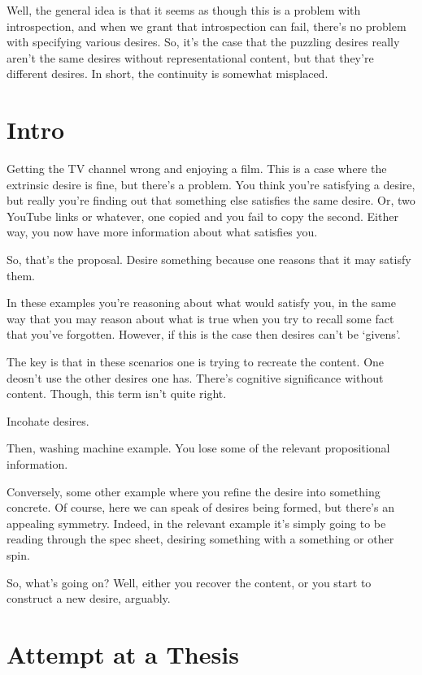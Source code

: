 \documentclass[10pt]{article}
\begin{document}
{\color{blue} Well, the general idea is that it seems as though this is a problem with introspection, and when we grant that introspection can fail, there's no problem with specifying various desires.
  So, it's the case that the puzzling desires really aren't the same desires without representational content, but that they're different desires.
  In short, the continuity is somewhat misplaced.}



\section{Intro}
\label{sec:intro}

Getting the TV channel wrong and enjoying a film.
This is a case where the extrinsic desire is fine, but there's a problem.
You think you're satisfying a desire, but really you're finding out that something else satisfies the same desire.
Or, two YouTube links or whatever, one copied and you fail to copy the second.
Either way, you now have more information about what satisfies you.

So, that's the proposal.
Desire something because one reasons that it may satisfy them.

In these examples you're reasoning about what would satisfy you, in the same way that you may reason about what is true when you try to recall some fact that you've forgotten.
However, if this is the case then desires can't be `givens'.

The key is that in these scenarios one is trying to recreate the content.
One deosn't use the other desires one has.
There's cognitive significance without content.
Though, this term isn't quite right.

Incohate desires.

Then, washing machine example.
You lose some of the relevant propositional information.

Conversely, some other example where you refine the desire into something concrete.
Of course, here we can speak of desires being formed, but there's an appealing symmetry.
Indeed, in the relevant example it's simply going to be reading through the spec sheet, desiring something with a something or other spin.


So, what's going on?
Well, either you recover the content, or you start to construct a new desire, arguably.

\section{Attempt at a Thesis}
\label{sec:attempt-at-thesis}
\end{document}
